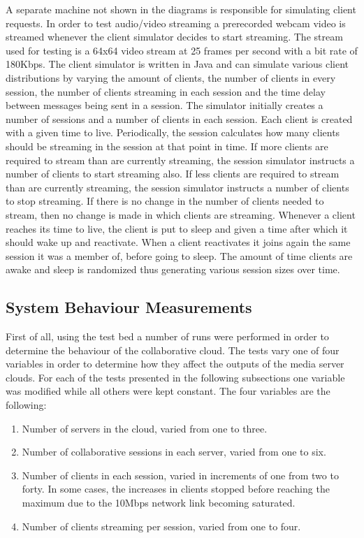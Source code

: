 A separate machine not shown in the diagrams is responsible for simulating client requests. In order to test audio/video streaming a prerecorded webcam video is streamed whenever the client simulator decides to start streaming. The stream used for testing is a 64x64 video stream at 25 frames per second with a bit rate of 180Kbps. The client simulator is written in Java and can simulate various client distributions by varying the amount of clients, the number of clients in every session, the number of clients streaming in each session and the time delay between messages being sent in a session. The simulator initially creates a number of sessions and a number of clients in each session. Each client is created with a given time to live. Periodically, the session calculates how many clients should be streaming in the session at that point in time. If more clients are required to stream than are currently streaming, the session simulator instructs a number of clients to start streaming also. If less clients are required to stream than are currently streaming, the session simulator instructs a number of clients to stop streaming. If there is no change in the number of clients needed to stream, then no change is made in which clients are streaming. Whenever a client reaches its time to live, the client is put to sleep and given a time after which it should wake up and reactivate. When a client reactivates it joins again the same session it was a member of, before going to sleep. The amount of time clients are awake and sleep is randomized thus generating various session sizes over time.

\subsection{System Behaviour Measurements}

First of all, using the test bed a number of runs were performed in order to determine the behaviour of the collaborative cloud. The tests vary one of four variables in order to determine how they affect the outputs of the media server clouds. For each of the tests presented in the following subsections one variable was modified while all others were kept constant. The four variables are the following:

\begin{enumerate}
	\item Number of servers in the cloud, varied from one to three.
	\item Number of collaborative sessions in each server, varied from one to six.
	\item Number of clients in each session, varied in increments of one from two to forty. In some cases, the increases in clients stopped before reaching the maximum due to the 10Mbps network link becoming saturated.
	\item Number of clients streaming per session, varied from one to four. 
\end{enumerate}

